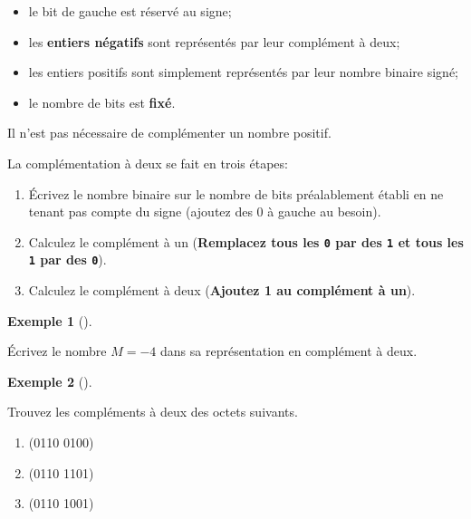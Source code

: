 \documentclass[
  letterpaper,
]{scrbook}
\providecommand{\tightlist}{%
  \setlength{\itemsep}{0pt}\setlength{\parskip}{0pt}}\usepackage{longtable,booktabs,array}
\theoremstyle{definition}
\newtheorem{example}{Exemple}[chapter]
\theoremstyle{definition}
\theoremstyle{plain}
\theoremstyle{remark}
\begin{document}
\begin{itemize}
\tightlist
\item
  le bit de gauche est réservé au signe;
\item
  les \textbf{entiers négatifs} sont représentés par leur complément à
  deux;
\item
  les entiers positifs sont simplement représentés par leur nombre
  binaire signé;
\item
  le nombre de bits est \textbf{fixé}.
\end{itemize}

\begin{tcolorbox}[enhanced jigsaw, colframe=quarto-callout-important-color-frame, bottomtitle=1mm, coltitle=black, breakable, arc=.35mm, title=\textcolor{quarto-callout-important-color}{\faExclamation}\hspace{0.5em}{Important}, opacitybacktitle=0.6, colback=white, opacityback=0, colbacktitle=quarto-callout-important-color!10!white, leftrule=.75mm, rightrule=.15mm, titlerule=0mm, toprule=.15mm, toptitle=1mm, left=2mm, bottomrule=.15mm]

Il n'est pas nécessaire de complémenter un nombre positif.

\end{tcolorbox}

La complémentation à deux se fait en trois étapes:

\begin{enumerate}
\def\labelenumi{\arabic{enumi}.}
\tightlist
\item
  Écrivez le nombre binaire sur le nombre de bits préalablement établi
  en ne tenant pas compte du signe (ajoutez des 0 à gauche au besoin).
\item
  Calculez le complément à un (\textbf{Remplacez tous les \texttt{0} par
  des \texttt{1} et tous les \texttt{1} par des \texttt{0}}).
\item
  Calculez le complément à deux (\textbf{Ajoutez 1 au complément à un}).
\end{enumerate}

\leavevmode{}%
\begin{example}[]\label{exm-nombre-moins-4-complement-deux}

Écrivez le nombre \(M=-4\) dans sa représentation en complément à deux.

\end{example}

\leavevmode{}%
\begin{example}[]\label{exm-complement-deux-octets}

Trouvez les compléments à deux des octets suivants.

\begin{enumerate}
\def\labelenumi{\alph{enumi})}
\tightlist
\item
  (0110 0100)
\item
  (0110 1101)
\item
  (0110 1001)
\end{enumerate}

\end{example}
\end{document}
